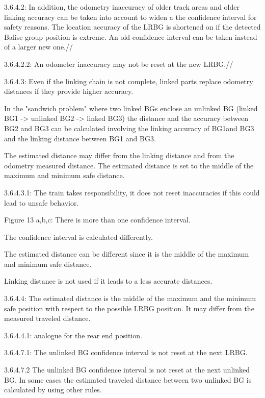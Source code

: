 3.6.4.2: In addition, the odometry inaccuracy of older track areas and older linking accuracy can be taken into account to widen a the confidence interval for safety reasons. The location accuracy of the LRBG is shortened on if the detected Balise group position is extreme. An old confidence interval can be taken instead of a larger new one.//

3.6.4.2.2: An odometer inaccuracy may not be reset at the new LRBG.//

3.6.4.3: Even if the linking chain is not complete, linked parts replace odometry distances if they provide higher accuracy.

In the "sandwich problem" where two linked BGs enclose an unlinked BG 
(linked BG1 -> unlinked BG2 -> linked BG3) 
the distance and the accuracy between BG2 and BG3 can be calculated involving the linking accuracy of BG1and BG3 and the linking distance between BG1 and BG3. 

The estimated distance may differ from the linking distance and from the odometry measured distance. The estimated distance is set to the middle of the maximum and minimum safe distance.

3.6.4.3.1:
The train takes responsibility, it does not reset inaccuracies if this could lead to unsafe behavior. 

Figure 13 a,b,c:
There is more than one confidence interval.

The confidence interval is calculated differently.

The estimated distance can be different since it is the middle of the maximum and minimum safe distance.

Linking distance is not used if it leads to a less accurate distances.

3.6.4.4:
The estimated distance is the middle of the maximum and the minimum safe position with respect to the possible LRBG position. It may differ from the measured traveled distance.

3.6.4.4.1:
analogue for the rear end position.

3.6.4.7.1:
The unlinked BG confidence interval is not reset at the next LRBG.

3.6.4.7.2
The unlinked BG confidence interval is not reset at the next unlinked BG. In some cases the estimated traveled distance between two unlinked BG is calculated by using other rules.
